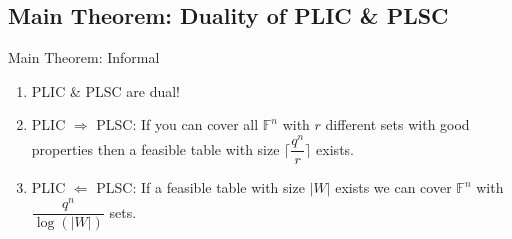 \documentclass[xcolor=dvipsnames, aspectratio=169]{beamer}
\begin{document}
\subsection{Main Theorem: Duality of PLIC \& PLSC}
\begin{frame}{Main Theorem: Informal}
	\begin{theorem}
		\begin{enumerate}
			\item <1->[]PLIC \& PLSC are dual!
			\item<2->[]
			PLIC $\Rightarrow$ PLSC: If you can cover all $\mathbb{F}^n$ with $r$ different sets with good properties then a feasible table with size $\lceil \dfrac{q^n}{r}\rceil $ exists.
			\item<3->[]
			PLIC $\Leftarrow$ PLSC:	If a feasible table with size $|W|$ exists we can cover $\mathbb{F}^n$ with $\dfrac{q^n}{\log(|W|)}$ sets.
		\end{enumerate}
	\end{theorem}
\end{frame}
\end{document}
